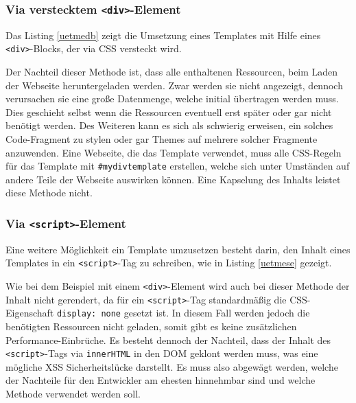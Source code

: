 \subsubsection{Via verstecktem \texttt{\textless{}div\textgreater{}}-Element}

Das Listing \ref{uetmedb} zeigt die Umsetzung eines Templates mit Hilfe eines \texttt{\textless{}div\textgreater{}}-Blocks, der via \ac{CSS} versteckt wird.



Der Nachteil dieser Methode ist, dass alle enthaltenen Ressourcen, beim Laden der Webseite heruntergeladen werden. Zwar werden sie nicht angezeigt, dennoch verursachen sie eine große Datenmenge, welche initial übertragen werden muss. Dies geschieht selbst wenn die Ressourcen eventuell erst später oder gar nicht benötigt werden. Des Weiteren kann es sich als schwierig erweisen, ein solches Code-Fragment zu stylen oder gar Themes auf mehrere solcher Fragmente anzuwenden. Eine Webseite, die das Template verwendet, muss alle \ac{CSS}-Regeln für das Template mit \texttt{\#mydivtemplate} erstellen, welche sich unter Umständen auf andere Teile der Webseite auswirken können. Eine Kapselung des Inhalts leistet diese Methode nicht.

\subsubsection{Via \texttt{\textless{}script\textgreater{}}-Element}

Eine weitere Möglichkeit ein Template umzusetzen besteht darin, den Inhalt eines Templates in ein \texttt{\textless{}script\textgreater{}}-Tag zu schreiben, wie in Listing \ref{uetmese} gezeigt.



Wie bei dem Beispiel mit einem \texttt{\textless{}div\textgreater{}}-Element wird auch bei dieser Methode der Inhalt nicht gerendert, da für ein \texttt{\textless{}script\textgreater{}}-Tag standardmäßig die \ac{CSS}-Eigenschaft \texttt{display:\ none} gesetzt ist. In diesem Fall werden jedoch die benötigten Ressourcen nicht geladen, somit gibt es keine zusätzlichen Performance-Einbrüche. Es besteht dennoch der Nachteil, dass der Inhalt des \texttt{\textless{}script\textgreater{}}-Tags via \texttt{innerHTML} in den \ac{DOM} geklont werden muss, was eine mögliche \ac{XSS} Sicherheitslücke darstellt. Es muss also abgewägt werden, welche der Nachteile für den Entwickler am ehesten hinnehmbar sind und welche Methode verwendet werden soll.



